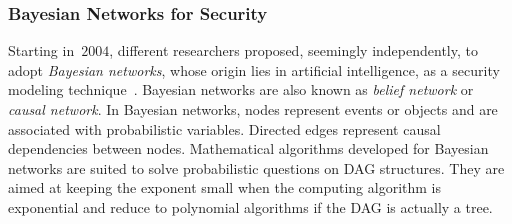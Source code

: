 \documentclass[a4paper]{article}
\begin{document}
\subsubsection{Bayesian Networks for Security} 
\label{sec:bayesian_networks}

Starting in~$2004$, different researchers proposed, seemingly independently, to
adopt \emph{Bayesian networks}, whose origin lies in artificial intelligence, 
as a security modeling technique~\cite{Pear2,Pear,Neap,JeNi}. Bayesian networks
are also known as \emph{belief network} or \emph{causal network}. In Bayesian
networks, nodes represent events or objects and are associated with
probabilistic variables. Directed edges represent causal dependencies between
nodes. Mathematical algorithms developed for Bayesian networks are suited to
solve probabilistic questions on DAG structures. They are aimed at keeping the
exponent small when the computing algorithm is exponential and reduce to 
polynomial algorithms if the DAG is actually a tree.
\end{document}
